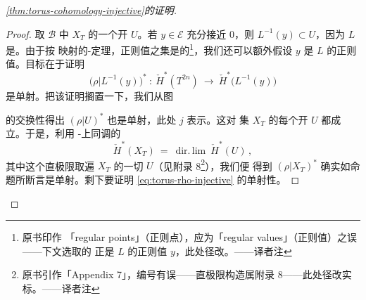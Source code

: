 \begin{proof}[\cref*{thm:torus-cohomology-injective}的证明]
\begin{proof}
取 $\mathcal{B}$ 中 $X_{T}$ 的一个开\trNeighborhood{} $U$。若 $y\in\mathcal{E}$%
充分接近 $0$，则 $L^{-1}(y)\subset U$，因为 $L$ 是\trProperMap。由于按\trFredholm{}%
映射的\trSard-\trSmale{}定理，正则值之集是\trDense{}的\footnote{原书印作%
「regular points」（正则点），应为「regular values」（正则值）之误——下文选取的%
正是 $L$ 的正则值 $y$，此处径改。——译者注}，我们还可以额外假设%
$y$ 是 $L$ 的正则值。目标在于证明
\begin{equation}\label{eq:torus-rho-injective}
\bigl(\rho|L^{-1}(y)\bigr)^{*}\ :\ \check{H}^{*}(T^{2n})\ \longrightarrow\ %
\check{H}^{*}\bigl(L^{-1}(y)\bigr)
\end{equation}
是单射。把该证明搁置一下，我们从图
\begin{center}
\end{center}
的交换性得出 $(\rho|U)^{*}$ 也是单射，此处 $j$ 表示\trInclusionMapping。这对%
\trCompact{}集 $X_{T}$ 的每个开\trNeighborhood{} $U$ 都成立。于是，利用%
\trAlexander-\trSpanier{}上同调的\trContinuity
\begin{equation}\label{eq:torus-direct-limit}
\check{H}^{*}(X_{T})\ =\ \operatorname{dir.\,lim}\ \check{H}^{*}(U)\,,
\end{equation}
其中这个直极限取遍 $X_{T}$ 的一切\trNeighborhood{} $U$（见附录 8\footnote{原书引作「Appendix 7」，编号有误——直极限构造属附录 8——此处径改实标。——译者注}），我们便%
得到 $(\rho|X_{T})^{*}$ 确实如命题所断言是单射。剩下要证明 \eqref{eq:torus-rho-injective}%
的单射性。


\end{proof}
\end{proof}
